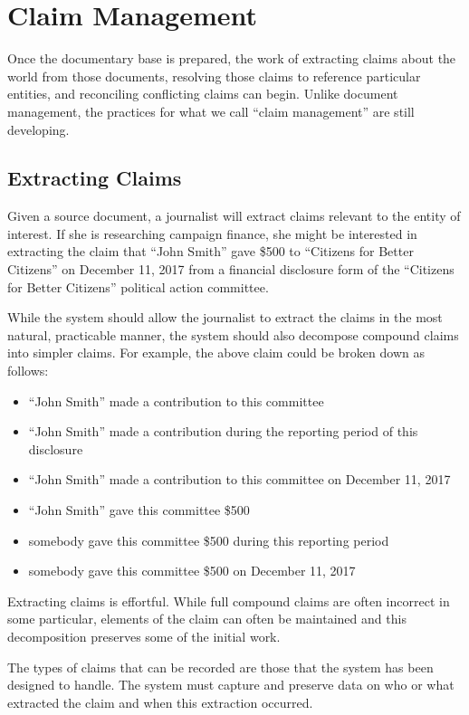 \documentclass[format=siggraph, review=true]{acmart}
\begin{document}
\section{Claim Management}
Once the documentary base is prepared, the work of extracting claims
about the world from those documents, resolving those claims to
reference particular entities, and reconciling conflicting claims can
begin. Unlike document management, the practices for what we call
``claim management'' are still developing.

\subsection{Extracting Claims}
Given a source document, a journalist will extract claims relevant to
the entity of interest. If she is researching campaign finance, she
might be interested in extracting the claim that ``John Smith''
gave \$500 to ``Citizens for Better Citizens'' on December 11, 2017
from a financial disclosure form of the ``Citizens for Better
Citizens'' political action committee.

While the system should allow the journalist to extract the claims in the
most natural, practicable manner, the system should also decompose compound
claims into simpler claims. For example, the above
claim could be broken down as follows:

\begin{itemize}
\item ``John Smith'' made a contribution to this committee
\item ``John Smith'' made a contribution during the reporting period of this disclosure
\item ``John Smith'' made a contribution to this committee on December 11, 2017
\item ``John Smith'' gave this committee \$500
\item somebody gave this committee \$500 during this reporting period
\item somebody gave this committee \$500 on December 11, 2017
\end{itemize}

Extracting claims is effortful. While full compound claims are often
incorrect in some particular, elements of the claim can often be
maintained and this decomposition preserves some of the initial work.

The types of claims that can be recorded are those that the system has
been designed to handle. The system must capture and preserve data on
who or what extracted the claim and when this extraction occurred.
\end{document}
